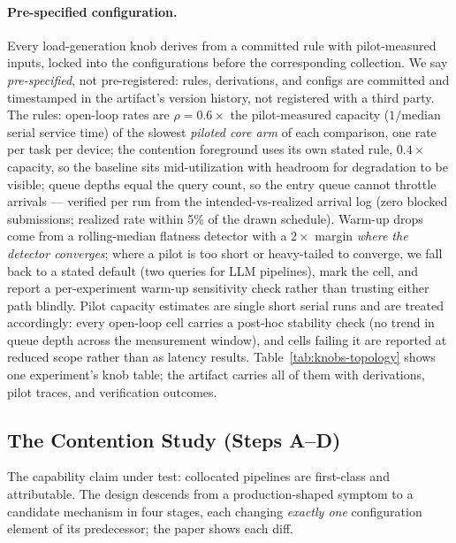 \paragraph{Pre-specified configuration.} Every load-generation knob derives
from a committed rule with pilot-measured inputs, locked into the
configurations before the corresponding collection. We say
\emph{pre-specified}, not pre-registered: rules, derivations, and configs
are committed and timestamped in the artifact's version history, not
registered with a third party. The rules: open-loop rates are $\rho =
0.6\times$ the pilot-measured capacity ($1/\mathrm{median}$ serial service
time) of the slowest \emph{piloted core arm} of each comparison, one rate
per task per device; the contention foreground uses its own stated rule,
$0.4\times$ capacity, so the baseline sits mid-utilization with headroom
for degradation to be visible; queue depths equal the query count, so the
entry queue cannot throttle arrivals --- verified per run from the
intended-vs-realized arrival log (zero blocked submissions; realized rate
within 5\% of the drawn schedule). Warm-up drops come from a rolling-median
flatness detector with a $2\times$ margin \emph{where the detector
converges}; where a pilot is too short or heavy-tailed to converge, we fall
back to a stated default (two queries for LLM pipelines), mark the cell,
and report a per-experiment warm-up sensitivity check rather than trusting
either path blindly. Pilot capacity estimates are single short serial runs
and are treated accordingly: every open-loop cell carries a post-hoc
stability check (no trend in queue depth across the measurement window),
and cells failing it are reported at reduced scope rather than as latency
results. Table~\ref{tab:knobs-topology} shows one experiment's knob table; the
artifact carries all of them with derivations, pilot traces, and
verification outcomes.

\subsection{The Contention Study (Steps A--D)}
\label{sec:setup-staged}

The capability claim under test: collocated pipelines are first-class and
attributable. The design descends from a production-shaped symptom to a
candidate mechanism in four stages, each changing \emph{exactly one}
configuration element of its predecessor; the paper shows each diff.

